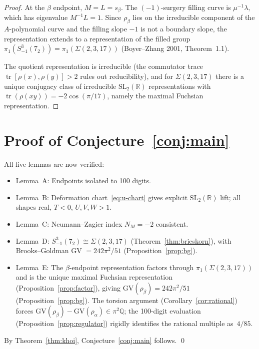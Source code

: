 \documentclass[11pt]{article}
\theoremstyle{remark}
\begin{document}
\begin{proof}
At the $\beta$ endpoint, $M = L = s_\beta$.
The $(-1)$-surgery filling curve is $\mu^{-1}\lambda$,
which has eigenvalue $M^{-1}L = 1$.  Since $\rho_\beta$
lies on the irreducible component of the $A$-polynomial
curve and the filling slope $-1$ is not a boundary slope,
the representation extends to a representation of the
filled group $\pi_1(S^3_{-1}(7_2)) = \pi_1(\Sigma(2,3,17))$
(Boyer--Zhang 2001, Theorem~1.1).

The quotient representation is irreducible (the
commutator trace $\operatorname{tr}[\rho(x),\rho(y)] > 2$
rules out reducibility), and for $\Sigma(2,3,17)$ there
is a unique conjugacy class of irreducible
$\mathrm{SL}_2(\mathbb{R})$ representations with
$\operatorname{tr}(\rho(xy)) = -2\cos(\pi/17)$, namely the
maximal Fuchsian representation.
\end{proof}

\section{Proof of Conjecture~\ref{conj:main}}

All five lemmas are now verified:
\begin{itemize}
\item Lemma~A: Endpoints isolated to 100 digits.
\item Lemma~B: Deformation chart~\eqref{eq:u-chart} gives explicit
  $\mathrm{SL}_2(\mathbb{R})$ lift; all shapes real,
  $T < 0$, $U,V,W > 1$.
\item Lemma~C: Neumann--Zagier index $N_M = -2$ consistent.
\item Lemma~D: $S^3_{-1}(7_2) \cong \Sigma(2,3,17)$
  (Theorem~\ref{thm:brieskorn}), with
  Brooks--Goldman GV $= 242\pi^2/51$
  (Proposition~\ref{prop:bg}).
\item Lemma~E: The $\beta$-endpoint representation factors
  through $\pi_1(\Sigma(2,3,17))$ and is the unique maximal
  Fuchsian representation (Proposition~\ref{prop:factor}),
  giving $\mathrm{GV}(\rho_\beta) = 242\pi^2/51$
  (Proposition~\ref{prop:bg}).
  The torsion argument (Corollary~\ref{cor:rational}) forces
  $\mathrm{GV}(\rho_\beta) - \mathrm{GV}(\rho_\alpha)
  \in \pi^2\mathbb{Q}$;
  the 100-digit evaluation (Proposition~\ref{prop:regulator})
  rigidly identifies the rational multiple as~$4/85$.
\end{itemize}

By Theorem~\ref{thm:khoi}, Conjecture~\ref{conj:main}
follows.  \qed
\end{document}

